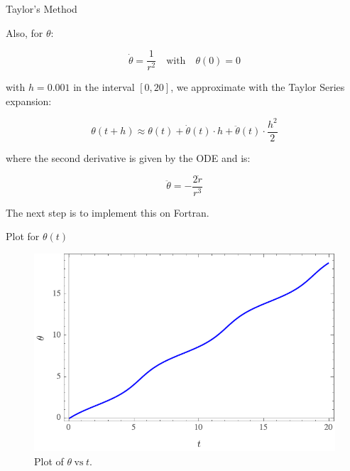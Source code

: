 \documentclass[hyperref={pdfpagelabels=false}]{beamer}
\begin{document}
\begin{frame}{Taylor's Method}

\begin{block}{Also, for $\theta$:}

\begin{equation}
\dot{\theta} =\frac{1}{r^2} \quad \text{with} \quad \theta(0)=0
\end{equation}
\end{block}

with $h=0.001$ in the interval $[0,20]$, we approximate with the Taylor Series expansion:


 \begin{equation*}
\theta(t+h) \approx \theta(t) + \dot{\theta}(t) \cdot h + \ddot{\theta}(t) \cdot \frac{h^2}{2}
\end{equation*} 

where the second derivative is given by the ODE and is:

\begin{equation}
\ddot{\theta} = - \frac{2\dot{r}}{r^3}
\end{equation}

The next step is to implement this on Fortran.
\end{frame}



\begin{frame}{Plot for $\theta(t)$}

\begin{figure}
\includegraphics[width=0.8\linewidth]{Figures/thetavst.png}
\caption{Plot of $\theta \hspace{3pt} \text{vs} \hspace{3pt}  t$.}
\end{figure}
    
\end{frame}
\end{document}
